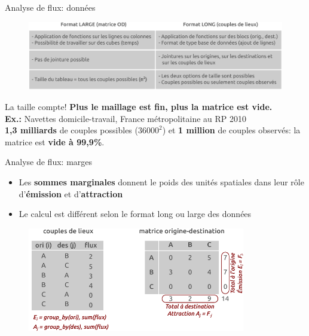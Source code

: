 \begin{frame}{Analyse de flux: données}

\begin{figure}
  \includegraphics[width=12.1cm]{LongLarge.pdf}
\end{figure}

\begin{block}{La taille compte!}
  \textbf{Plus le maillage est fin, plus la matrice est vide.} \\ \textbf{Ex.:} Navettes domicile-travail, France métropolitaine au RP 2010 \\ \textbf{1,3 milliards} de couples possibles ($36000^2$) et \textbf{1 million} de couples observés: la matrice est \textbf{vide à 99,9\%}.
\end{block}

\end{frame}


\begin{frame}{Analyse de flux: marges}

\begin{itemize}
  \item Les \textbf{sommes marginales} donnent le poids des unités spatiales dans leur rôle d'\textbf{émission} et d'\textbf{attraction}
  \item Le calcul est différent selon le format long ou large des données
\end{itemize}

\begin{figure}
  \includegraphics[width=9.5cm]{MatriceOD_marges.pdf}
\end{figure}

\end{frame}



